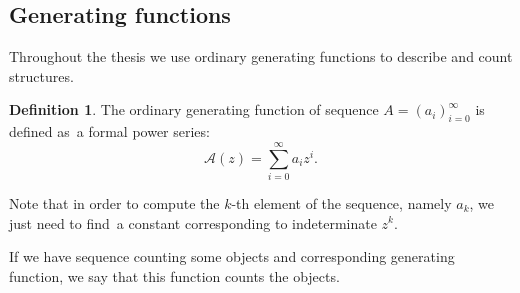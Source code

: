 \documentclass[final]{article}
\theoremstyle{definition}
\newtheorem{definition}{Definition}[subsection]
\theoremstyle{definition}
\theoremstyle{remark}
\newcommand{\gf}[1]{\ensuremath{\mathcal{#1}}}
\begin{document}
\subsection{Generating functions}%
\label{sub:generating_functions}

Throughout the thesis we use ordinary generating functions to describe and count structures.

\begin{definition}
The ordinary generating function of sequence \(A = (a_i)_{i=0}^{\infty}\) is defined as~a formal power series:
\[\gf{A}(z) = \sum_{i=0}^{\infty} a_i z^i .\]
\end{definition}

Note that in order to compute the \(k\)-th element of the sequence, namely \(a_k\), we just need to find~a constant corresponding to indeterminate \(z^k\).

If we have sequence counting some objects and corresponding generating function, we say that this function counts the objects.
\end{document}
